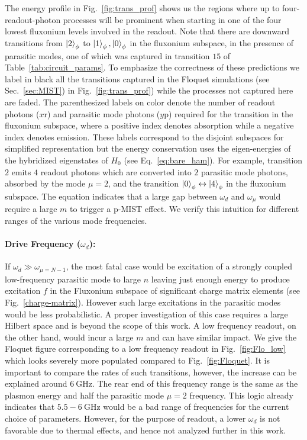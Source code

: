 \documentclass[%
reprint,
superscriptaddress,
 amsmath,amssymb,
 aps,
 prx,
longbibliography,
floatfix,
]{revtex4-2}
\begin{document}
The energy profile in Fig.~\ref{fig:trans_prof} shows us the regions where up to four-readout-photon processes will be prominent when starting in one of the four lowest fluxonium levels involved in the readout. Note that there are downward transitions from $\ket{2}_\phi$ to $\ket{1}_\phi,\ket{0}_\phi$ in the fluxonium subspace, in the presence of parasitic modes, one of which was captured in transition $15$ of Table~\ref{tab:circuit_params}. To emphasize the correctness of these predictions we label in black all the transitions captured in the Floquet simulations (see Sec.~\ref{sec:MIST}) in Fig.~\ref{fig:trans_prof}) while the processes not captured here are faded. The parenthesized labels on color denote the number of readout photons ($x \mathrm{r}$) and parasitic mode photons ($y\mathrm{p}$) required for the transition in the fluxonium subspace, where a positive index denotes absorption while a negative index denotes emission. These labels correspond to the disjoint subspaces for simplified representation but the energy conservation uses the eigen-energies of the hybridized eigenstates of $H_{0}$ (see Eq.~\ref{eq:bare_ham}). For example, transition $2$ emits $4$ readout photons which are converted into $2$ parasitic mode photons, absorbed by the mode $\mu=2$, and the transition $\ket{0}_\phi\leftrightarrow \ket{4}_\phi$ in the fluxonium subspace. The equation indicates that a large gap between $\omega_d$ and $\omega_\mu$ would require a large $m$ to trigger a p-MIST effect. We verify this intuition for different ranges of the various mode frequencies. 

\paragraph{Drive Frequency ($\omega_d$):} If $\omega_d\gg \omega_{\mu=N-1}$, the most fatal case would be excitation of a strongly coupled low-frequency parasitic mode to large $n$ leaving just enough energy to produce excitation $f$ in the Fluxonium subspace of significant charge matrix elements (see Fig.~\ref{charge-matrix}). However such large excitations in the parasitic modes would be less probabilistic. A proper investigation of this case requires a large Hilbert space and is beyond the scope of this work. A low frequency readout, on the other hand, would incur a large $m$ and can have similar impact. We give the Floquet figure corresponding to a low frequency readout in Fig.~\ref{fig:Flo_low} which looks severely more populated compared to Fig.~\ref{fig:Floquet}. It is important to compare the rates of such transitions, however, the increase can be explained around $6 \ \mathrm{GHz}$. The rear end of this frequency range is the same as the plasmon energy and half the parasitic mode $\mu=2$ frequency. This logic already indicates that $5.5-6 \ \mathrm{GHz}$ would be a bad range of frequencies for the current choice of parameters. However, for the purpose of readout, a lower $\omega_d$ is not favorable due to thermal effects, and hence not analyzed further in this work.  
\end{document}
